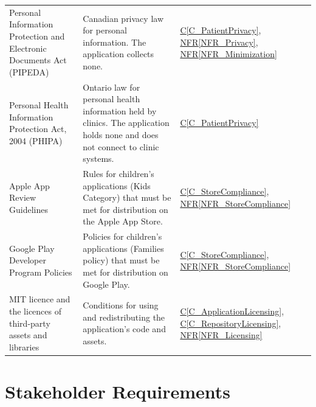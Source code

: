 \documentclass[10pt]{article}
\newcommand{\conref}[1]{\hyperref[#1]{C\ref*{#1}}}
\newcommand{\nfrref}[1]{\hyperref[#1]{NFR\ref*{#1}}}
\begin{document}
\begin{longtable}{@{}>{\raggedright\arraybackslash}p{} >{\raggedright\arraybackslash}p{} >{\raggedright\arraybackslash}p{}@{}}
Personal Information Protection and Electronic Documents Act (PIPEDA)
& Canadian privacy law for personal information. The application collects none.
& \conref{C_PatientPrivacy}, \nfrref{NFR_Privacy}, \nfrref{NFR_Minimization} \\

Personal Health Information Protection Act, 2004 (PHIPA)
& Ontario law for personal health information held by clinics. The application holds none and does not connect to clinic systems.
& \conref{C_PatientPrivacy} \\

Apple App Review Guidelines \cite{AppleGuidelines}
& Rules for children's applications (Kids Category) that must be met for distribution on the Apple App Store.
& \conref{C_StoreCompliance}, \nfrref{NFR_StoreCompliance} \\

Google Play Developer Program Policies \cite{GooglePlayPolicy}
& Policies for children's applications (Families policy) that must be met for distribution on Google Play.
& \conref{C_StoreCompliance}, \nfrref{NFR_StoreCompliance} \\

MIT licence and the licences of third-party assets and libraries
& Conditions for using and redistributing the application's code and assets.
& \conref{C_ApplicationLicensing}, \conref{C_RepositoryLicensing}, \nfrref{NFR_Licensing} \\

\end{longtable}

\newpage
\section{Stakeholder Requirements}
\label{sec_StakeholderReqs}
\end{document}
